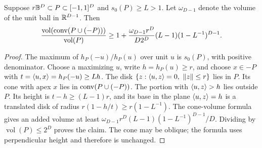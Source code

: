 \begin{lemma}\label{lem:cap-volume52}
Suppose $r\mathbb B^D\subset P\subset[-1,1]^D$ and $s_0(P)\ge L>1$.
Let $\omega_{D-1}$ denote the volume of the unit ball in $\mathbb R^{D-1}$.
Then
\begin{equation}\label{eq:cap-volume52}
 \frac{\operatorname{vol}(\operatorname{conv}(P\cup(-P)))}{\operatorname{vol}(P)}
 \ge1+\frac{\omega_{D-1}r^D}{D2^D}
                    (L-1)(1-L^{-1})^{D-1}.
\end{equation}
\end{lemma}
\begin{proof}
The maximum of $h_P(-u)/h_P(u)$ over unit $u$ is $s_0(P)$, with
positive denominator. Choose a maximizing $u$, write $h=h_P(u)\ge r$,
and choose $x\in-P$ with $t=\langle u,x\rangle=h_P(-u)\ge Lh$.
The disk $\{z:\langle u,z\rangle=0,\ \|z\|\le r\}$ lies in $P$.
Its cone with apex $x$ lies in $\operatorname{conv}(P\cup(-P))$.
The portion with $\langle u,z\rangle>h$ lies outside $P$. Its height is
$t-h\ge(L-1)r$, and its base in the plane $\langle u,z\rangle=h$ is a
translated disk of radius $r(1-h/t)\ge r(1-L^{-1})$.
The cone-volume formula gives an added volume at least
$\omega_{D-1}r^D(L-1)(1-L^{-1})^{D-1}/D$.
Dividing by $\operatorname{vol}(P)\le2^D$ proves the claim.
The cone may be oblique; the formula uses perpendicular height and
therefore is unchanged.
\end{proof}

